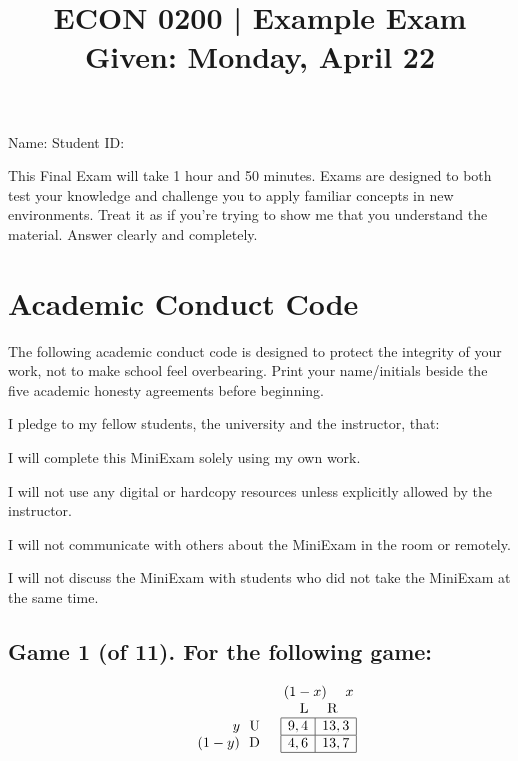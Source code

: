 \documentclass[11pt]{article}
\title{\textbf{ECON 0200 | Example Exam} \\ Given: Monday, April 22}
\author{}
\date{}
\begin{document}
\maketitle
\vspace{-2cm}
Name: \raisebox{-1ex}{\rule{6.3cm}{1pt}}  \hfill Student ID: \raisebox{-1ex}{\rule{6.3cm}{1pt}}

This Final Exam will take 1 hour and 50 minutes. Exams are designed to both test your knowledge and challenge you to apply familiar concepts in new environments. Treat it as if you're trying to show me that you understand the material. Answer clearly and completely. 


\section*{Academic Conduct Code
}
The following academic conduct code is designed to protect the integrity of your work, not to make school feel overbearing. Print your name/initials beside the five academic honesty agreements before beginning. 


I pledge to my fellow students, the university and the instructor, that:

\raisebox{-1ex}{\rule{1.2cm}{1pt}} I will complete this MiniExam solely using my own work. 

\raisebox{-1ex}{\rule{1.2cm}{1pt}} I will not use any digital or hardcopy resources unless explicitly allowed by the instructor.

\raisebox{-1ex}{\rule{1.2cm}{1pt}} I will not communicate with others about the MiniExam in the room or remotely. 

\raisebox{-1ex}{\rule{1.2cm}{1pt}} I will not discuss the MiniExam with students who did not take the MiniExam at the same time.


\pagebreak

\subsection*{Game 1 (of 11). For the following game:
}
$$
\begin{array}{lccc}
    & & & (1-x) \ \ \ \ x\\
    & & & \text{L} \ \ \ \ \text{R}\\
    & &
    \begin{array}{r}
        y \ \ \text{U} \\
        (1-y) \ \ \text{D} \\
    \end{array} &
    \begin{array}{|c|c|}
        \hline
        9,4 & 13,3 \\
        \hline
        4,6 & 13,7 \\
        \hline
    \end{array}
\end{array}
$$
\end{document}
